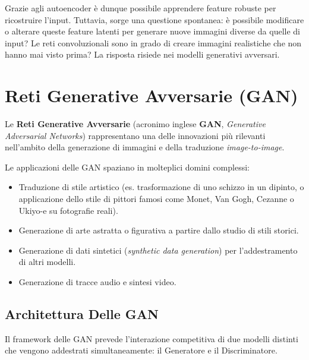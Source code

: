 ﻿\documentclass[11pt, a4paper]{article}
\begin{document}
Grazie agli autoencoder è dunque possibile apprendere feature robuste per ricostruire l'input. Tuttavia, sorge una questione spontanea: è possibile modificare o alterare queste feature latenti per generare nuove immagini diverse da quelle di input? Le reti convoluzionali sono in grado di creare immagini realistiche che non hanno mai visto prima? La risposta risiede nei modelli generativi avversari.

\newpage

\section{Reti Generative Avversarie (GAN)}

Le \textbf{Reti Generative Avversarie} (acronimo inglese \textbf{GAN}, \emph{Generative Adversarial Networks}) rappresentano una delle innovazioni più rilevanti nell'ambito della generazione di immagini e della traduzione \emph{image-to-image}.


Le applicazioni delle GAN spaziano in molteplici domini complessi:
\begin{itemize}
    \item Traduzione di stile artistico (es. trasformazione di uno schizzo in un dipinto, o applicazione dello stile di pittori famosi come Monet, Van Gogh, Cezanne o Ukiyo-e su fotografie reali).
    \item Generazione di arte astratta o figurativa a partire dallo studio di stili storici.
    \item Generazione di dati sintetici (\emph{synthetic data generation}) per l'addestramento di altri modelli.
    \item Generazione di tracce audio e sintesi video.
\end{itemize}


\subsection{Architettura Delle GAN}

Il framework delle GAN prevede l'interazione competitiva di due modelli distinti che vengono addestrati simultaneamente: il Generatore e il Discriminatore.
\end{document}

